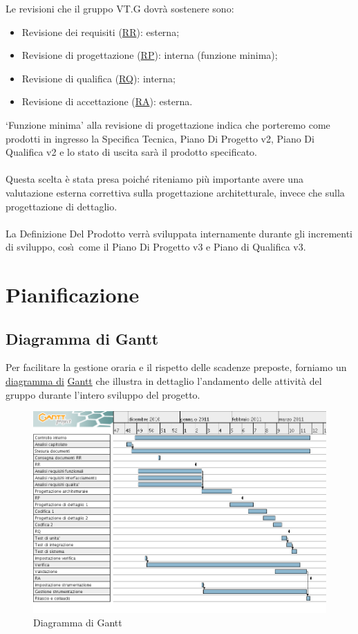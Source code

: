 Le revisioni che il gruppo VT.G dovr\`a sostenere sono:
\begin{itemize}
  \item Revisione dei requisiti (\underline{RR}): esterna;
  \item Revisione di progettazione (\underline{RP}): interna (funzione minima);
  \item Revisione di qualifica (\underline{RQ}): interna;
  \item Revisione di accettazione (\underline{RA}): esterna.
\end{itemize} \vspace{0.5cm}

`Funzione minima' alla revisione di progettazione indica che porteremo come
prodotti in ingresso la Specifica Tecnica, Piano Di Progetto v2, Piano Di
Qualifica v2 e lo stato di uscita sar\`a il prodotto specificato.\\
\\
Questa scelta \`e stata presa poich\'e riteniamo pi\`u importante avere una
valutazione esterna correttiva sulla progettazione architetturale, invece che
sulla progettazione di dettaglio.\\
\\
La Definizione Del Prodotto verr\`a sviluppata internamente durante gli
incrementi di sviluppo, cos\`\i\ come il Piano Di Progetto v3 e Piano di
Qualifica v3.


\chapter{Pianificazione}
\thispagestyle{fancy}

\section{Diagramma di Gantt}
Per facilitare la gestione oraria e il rispetto delle scadenze preposte,
forniamo un \underline{diagramma di} \underline{Gantt} che illustra in dettaglio
l'andamento delle attivit\`a del gruppo durante l'intero sviluppo del progetto.
\vspace{0.8cm}
\begin{figure}[htbp]
  \centering
  \includegraphics[width=17.2cm, angle=0]{img/PP/gantt.png}
\caption{Diagramma di Gantt}
\end{figure}
\newpage

